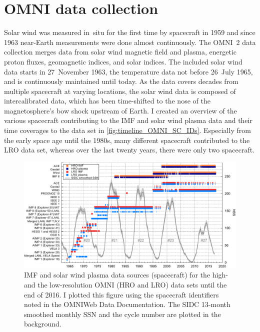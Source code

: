 \section{OMNI data collection}
\label{sec:omni_data_collection}
Solar wind was measured in~situ for the first time by spacecraft in 1959 and since 1963 near-Earth measurements were done almost continuously. The OMNI~2 data collection \citep{King2005} merges data from solar wind magnetic field and plasma, energetic proton fluxes, geomagnetic indices, and solar indices. The included solar wind data starts in 27~November 1963, the temperature data not before 26~July 1965, and is continuously maintained until today. As the data covers decades from multiple spacecraft at varying locations, the solar wind data is composed of intercalibrated data, which has been time-shifted to the nose of the magnetosphere's bow shock upstream of Earth. I created an overview of the various spacecraft contributing to the IMF and solar wind plasma data and their time coverages to the data set in \autoref{fig:timeline_OMNI_SC_IDs}. Especially from the early space age until the 1980s, many different spacecraft contributed to the LRO data set, whereas over the last twenty years, there were only two spacecraft.
\begin{figure}[htb]
	\centering
	\includegraphics[width=\textwidth]{figures_of_mine/gnuplots/timeline_OMNI_SC_IDs.pdf}
	\caption[I created the figure myself.]
	{IMF and solar wind plasma data sources (spacecraft) for the high- and the low-resolution OMNI (HRO and LRO) data sets until the end of 2016. I plotted this figure using the spacecraft identifiers noted in the OMNIWeb Data Documentation\protect\footnotemark. The SIDC 13-month smoothed monthly SSN and the cycle number are plotted in the background.}
	\label{fig:timeline_OMNI_SC_IDs}
\end{figure}

